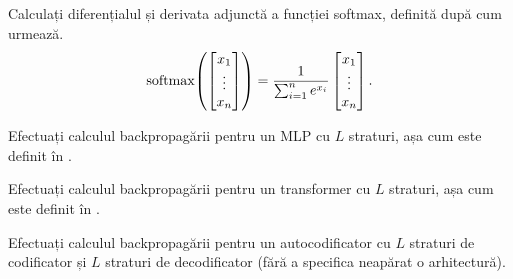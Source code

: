 \documentclass[../../book-main_ro.tex]{subfiles}
\begin{document}
\begin{exercise}
    Calculați diferențialul și derivata adjunctă a funcției softmax, definită după cum urmează.
    \begin{equation}
        \softmax\rp{\mat{x_{1} \\ \vdots \\ x_{n}}} = \frac{1}{\sum_{i = 1}^{n}e^{x_{i}}}\mat{x_{1} \\ \vdots \\ x_{n}}.
    \end{equation}
\end{exercise}

\begin{exercise}
    Efectuați calculul backpropagării pentru un MLP cu \(L\) straturi, așa cum este definit în .
\end{exercise}

\begin{exercise}
    Efectuați calculul backpropagării pentru un transformer cu \(L\) straturi, așa cum este definit în .
\end{exercise}

\begin{exercise}
    Efectuați calculul backpropagării pentru un autocodificator cu \(L\) straturi de codificator și \(L\) straturi de decodificator (fără a specifica neapărat o arhitectură).
\end{exercise}
\end{document}

